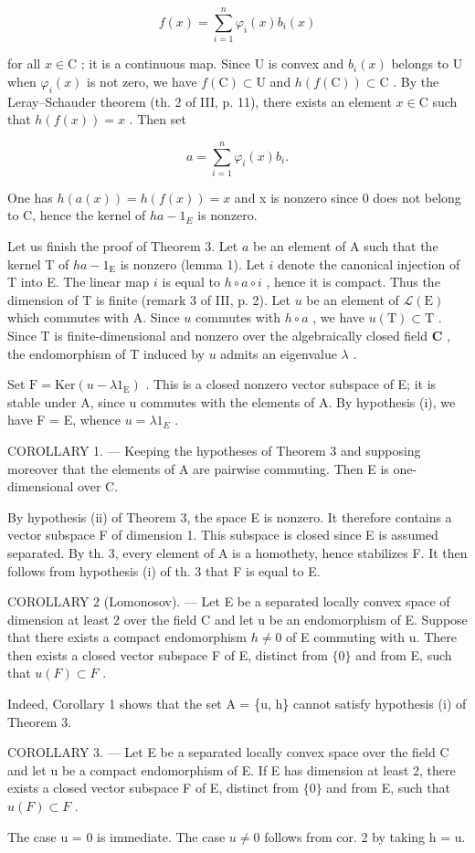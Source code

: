 \[
f (x) = \sum_ {i = 1} ^ {n} \varphi_ {i} (x) b _ {i} (x)
\]

for all \(x \in \mathrm{C}\) ; it is a continuous map. Since U is convex and \(b_i(x)\) belongs to U when \(\varphi_i(x)\) is not zero, we have \(f(\mathrm{C}) \subset \mathrm{U}\) and \(h(f(\mathrm{C})) \subset \mathrm{C}\) . By the Leray--Schauder theorem (th. 2 of III, p. 11), there exists an element \(x \in \mathrm{C}\) such that \(h(f(x)) = x\) . Then set

\[
a = \sum_ {i = 1} ^ {n} \varphi_ {i} (x) b _ {i}.
\]

One has \(h(a(x)) = h(f(x)) = x\) and x is nonzero since 0 does not belong to C, hence the kernel of \(ha - 1_{E}\) is nonzero.

Let us finish the proof of Theorem 3. Let \(a\) be an element of A such that the kernel T of \(ha - 1_{\mathrm{E}}\) is nonzero (lemma 1). Let \(i\) denote the canonical injection of T into E. The linear map \(i\) is equal to \(h \circ a \circ i\) , hence it is compact. Thus the dimension of T is finite (remark 3 of III, p. 2). Let \(u\) be an element of \(\mathcal{L}(\mathrm{E})\) which commutes with A. Since \(u\) commutes with \(h \circ a\) , we have \(u(\mathrm{T}) \subset \mathrm{T}\) . Since T is finite-dimensional and nonzero over the algebraically closed field \(\mathbf{C}\) , the endomorphism of T induced by \(u\) admits an eigenvalue \(\lambda\) .

Set \(\mathrm{F} = \mathrm{Ker}(u - \lambda1_{\mathrm{E}})\) . This is a closed nonzero vector subspace of E; it is stable under A, since u commutes with the elements of A. By hypothesis (i), we have F = E, whence \(u = \lambda1_{E}\) .

COROLLARY 1. --- Keeping the hypotheses of Theorem 3 and supposing moreover that the elements of A are pairwise commuting. Then E is one-dimensional over C.

By hypothesis (ii) of Theorem 3, the space E is nonzero. It therefore contains a vector subspace F of dimension 1. This subspace is closed since E is assumed separated. By th. 3, every element of A is a homothety, hence stabilizes F. It then follows from hypothesis (i) of th. 3 that F is equal to E.

COROLLARY 2 (Lomonosov). --- Let E be a separated locally convex space of dimension at least 2 over the field C and let u be an endomorphism of E. Suppose that there exists a compact endomorphism \(h \neq 0\) of E commuting with u. There then exists a closed vector subspace F of E, distinct from \(\{0\}\) and from E, such that \(u(F) \subset F\) .

Indeed, Corollary 1 shows that the set A = \{u, h\} cannot satisfy hypothesis (i) of Theorem 3.

COROLLARY 3. --- Let E be a separated locally convex space over the field C and let u be a compact endomorphism of E. If E has dimension at least 2, there exists a closed vector subspace F of E, distinct from \(\{0\}\) and from E, such that \(u(F) \subset F\) .

The case u = 0 is immediate. The case \(u \neq 0\) follows from cor. 2 by taking h = u.

